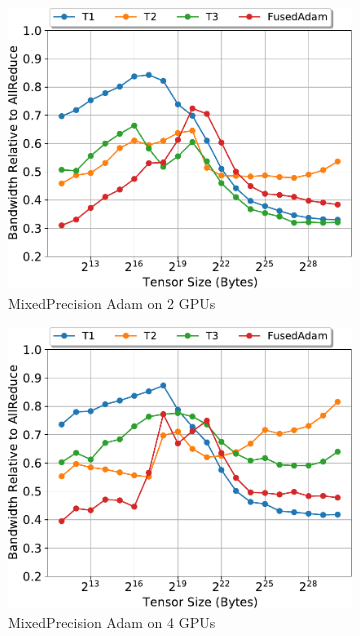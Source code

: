 \begin{figure}
  \begin{subfigure}{0.66\columnwidth}
    \includegraphics[width=\columnwidth]{figures/results-adamfp16-2-gpus.pdf} 
    \caption{MixedPrecision Adam on 2 GPUs} 
  \end{subfigure}
  \begin{subfigure}{0.66\columnwidth}
    \includegraphics[width=\columnwidth]{figures/results-adamfp16-4-gpus.pdf}  
    \caption{MixedPrecision Adam on 4 GPUs} 
  \end{subfigure}
  \begin{subfigure}{0.66\columnwidth}

\end{subfigure}
\end{figure}
